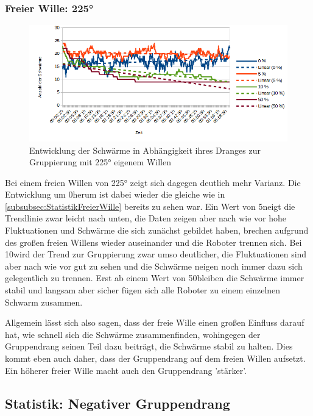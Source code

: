 \subsubsection*{Freier Wille: 225°}

\begin{figure}[h]
	\includegraphics[width=\textwidth, keepaspectratio]{graphics/Statistics/FlockGeneral/LocalRange1Speed01FreeWill225.png}
	\caption{Entwicklung der Schwärme in Abhängigkeit ihres Dranges zur Gruppierung mit 225° eigenem Willen}
	\label{pic:GeneralFlockStatistic3}
\end{figure}

Bei einem freien Willen von 225° zeigt sich dagegen deutlich mehr Varianz. Die Entwicklung um 0\per herum ist dabei wieder die gleiche wie in \autoref{subsubsec:StatistikFreierWille} bereits zu sehen war. Ein Wert von 5\per neigt die Trendlinie zwar leicht nach unten, die Daten zeigen aber nach wie vor hohe Fluktuationen und Schwärme die sich zunächst gebildet haben, brechen aufgrund des großen freien Willens wieder auseinander und die Roboter trennen sich. Bei 10\per wird der Trend zur Gruppierung zwar umso deutlicher, die Fluktuationen sind aber nach wie vor gut zu sehen und die Schwärme neigen noch immer dazu sich gelegentlich zu trennen. Erst ab einem Wert von 50\per bleiben die Schwärme immer stabil und langsam aber sicher fügen sich alle Roboter zu einem einzelnen Schwarm zusammen.

Allgemein lässt sich also sagen, dass der freie Wille einen großen Einfluss darauf hat, wie schnell sich die Schwärme zusammenfinden, wohingegen der Gruppendrang seinen Teil dazu beiträgt, die Schwärme stabil zu halten. Dies kommt eben auch daher, dass der Gruppendrang auf dem freien Willen aufsetzt. Ein höherer freier Wille macht auch den Gruppendrang 'stärker'.

\subsection*{Statistik: Negativer Gruppendrang}\label{subsec:EvaluationNegativerGruppendrang}

